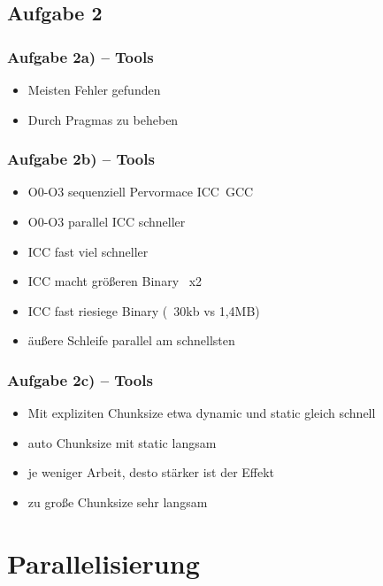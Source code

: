 \documentclass[german,notes,18pt]{beamer}
\begin{document}
	\subsection{Aufgabe 2}
	\begin{frame}
		\frametitle{Aufgabe 2a) -- Tools}
		
		\begin{itemize}
			\item Meisten Fehler gefunden
			\item Durch Pragmas zu beheben
		\end{itemize}
	\end{frame}
	\begin{frame}
		\frametitle{Aufgabe 2b) -- Tools}
		\begin{itemize}
			\item O0-O3 sequenziell Pervormace ICC~GCC
			\item O0-O3 parallel ICC schneller
			\item ICC fast viel schneller
			\item ICC macht größeren Binary ~x2
			\item ICC fast riesiege Binary (~30kb vs 1,4MB)
			\item äußere Schleife parallel am schnellsten
		\end{itemize}
	\end{frame}
	\begin{frame}
		\frametitle{Aufgabe 2c) -- Tools}
		\begin{itemize}
			\item Mit expliziten Chunksize etwa dynamic und static gleich schnell
			\item auto Chunksize mit static langsam
			\item je weniger Arbeit, desto stärker ist der Effekt
			\item zu große Chunksize sehr langsam
		\end{itemize}
	\end{frame}
	
	
	
	\section{Parallelisierung}
\end{document}

